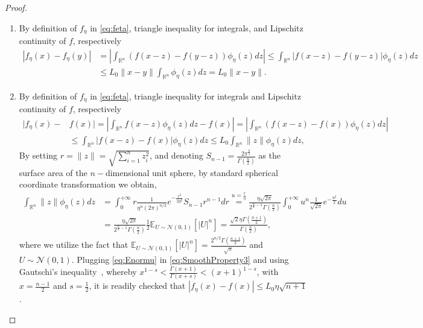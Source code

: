\documentclass[11pt,reqno]{amsart}
\newcommand{\1}{{\bf 1}}
\newcommand{\2}{{\bf 2}}
\numberwithin{equation}{section}
\theoremstyle{remark}
\begin{document}
		\begin{proof}
		\begin{enumerate}[label =\alph*., wide, labelwidth=!, labelindent=0pt]
			\item By definition of $f_\eta$ in \eqref{eq:feta}, triangle inequality for integrals, and Lipschitz continuity of $f$, respectively
			\begin{align*}
				|f_{\eta}(x)-f_{\eta}(y)|&= \left|\int_{\mathbb{R}^n}\left(f(x-z)-f(y-z)\right)\phi_{\eta}(z) d z\right| \leq \int_{\mathbb{R}^n}\left|f(x-z)-f(y-z)\right|\phi_{\eta}(z) d z\\
				&\leq L_0\|x-y\|\int_{\mathbb{R}^n}\phi_{\eta}(z) d z = L_0\|x-y\|.
			\end{align*}
			\item By definition of $f_\eta$ in \eqref{eq:feta}, triangle inequality for integrals and Lipschitz continuity of $f$, respectively
			\begin{align}\label{eq:SmoothProperty3}
				|f_{\eta}(x)-&f(x)|=\left|\int_{\mathbb{R}^n}f(x-z)\phi_{\eta}(z)dz-f(x)\right| =\left|\int_{\mathbb{R}^n}\left(f(x-z)-f(x)\right)\phi_{\eta}(z)dz\right|\nonumber\\
				& \leq \int_{\mathbb{R}^n}\left|f(x-z)-f(x)\right|\phi_{\eta}(z)dz \leq L_0 \int_{\mathbb{R}^n}\|z\|\phi_{\eta}(z)dz,
			\end{align}
			By setting $r=\|z\|=\sqrt{\sum_{i=1}^n z_i^2}$, and denoting $S_{n-1}=\frac{2\pi^{\frac{n}{2}}}{\Gamma(\frac{n}{2})}$ as the surface area of the $n-$dimensional unit sphere, by standard spherical coordinate transformation we obtain,
			\begin{align}\label{eq:Enormu}
				\int_{\mathbb{R}^n}\|z\|\phi_{\eta}(z)dz &=\int_0^{+\infty} r \tfrac{1}{\eta^n(2\pi)^{n/2}}e^{-\frac{r^2}{2\eta^2}}S_{n-1}r^{n-1}dr \stackrel{u=\tfrac{r}{\eta}}{=} \tfrac{\eta \sqrt{2 \pi}}{2^{\frac{n}{2}-1}\Gamma(\tfrac{n}{2})}\int_0^{+\infty}u^n \tfrac{1}{\sqrt{2\pi}}e^{-\frac{u^2}{2}}du\nonumber\\
				&=\tfrac{\eta \sqrt{2 \pi}}{2^{\frac{n}{2}-1}\Gamma(\frac{n}{2})} \tfrac{1}{2}\mathbb{E}_{U \sim \mathcal{N}(0,1)}\left[ \left|U\right|^n\right] = \tfrac{\sqrt{2}\eta\Gamma(\tfrac{n+1}{2})}{\Gamma(\tfrac{n}{2})},
			\end{align}
			where we utilize the fact that $\mathbb{E}_{U \sim \mathcal{N}(0,1)}[|U|^n]=\tfrac{2^{n/2}\Gamma(\frac{n+1}{2})}{\sqrt{\pi}}$ and $U \sim \mathcal{N}(0,1)$. Plugging \eqref{eq:Enormu} in \eqref{eq:SmoothProperty3} and using Gautschi's inequality~\cite{gautschi1959}, whereby $x^{1-s} < \frac{\Gamma(x+1)}{\Gamma(x+s)} < (x+1)^{1-s}$, with $x=\frac{n-1}{2}$ and $s=\frac{1}{2}$, it is readily checked that $|f_\eta(x)-f(x)| \leq L_0\eta\sqrt{n+1}$.

\end{enumerate}
\end{proof}
\end{document}
